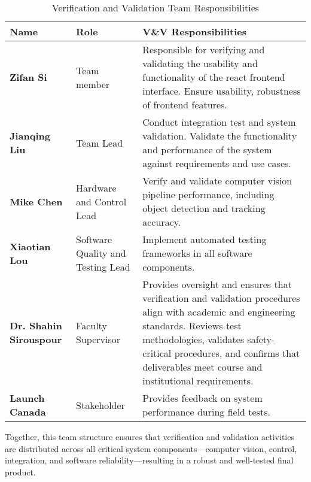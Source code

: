 \documentclass[12pt, titlepage]{article}
\begin{document}
\begin{table}[H]
\centering
\caption{Verification and Validation Team Responsibilities}
\label{tab:vnv_team}
\begin{tabular}{|p{3.5cm}|p{3.5cm}|p{8cm}|}
\hline
\textbf{Name} & \textbf{Role} & \textbf{V\&V Responsibilities} \\ \hline

\textbf{Zifan Si} & Team member & 
Responsible for verifying and validating the usability and functionality of the 
react frontend interface.
Ensure usability, robustness of frontend features. \\ \hline

\textbf{Jianqing Liu} & Team Lead & 
Conduct integration test and system validation. Validate the functionality and 
performance of the system against requirements and use cases. \\ \hline

\textbf{Mike Chen} & Hardware and Control Lead & 
Verify and validate computer vision pipeline performance, including object detection 
and tracking accuracy. \\ \hline

\textbf{Xiaotian Lou} & Software Quality and Testing Lead & 
Implement automated testing frameworks in all software components. \\ \hline

\textbf{Dr. Shahin Sirouspour} & Faculty Supervisor & 
Provides oversight and ensures that verification and validation procedures
 align with academic and engineering standards. 
Reviews test methodologies, validates safety-critical procedures, and 
confirms that deliverables meet course and institutional requirements. \\ \hline

\textbf{Launch Canada} & Stakeholder & 
Provides feedback on system performance during field tests.
\\ \hline

\end{tabular}
\end{table}

Together, this team structure ensures that verification and 
validation activities are distributed across all critical system 
components—computer vision, control, integration, and software 
reliability—resulting in a robust and well-tested final product.

\end{document}
